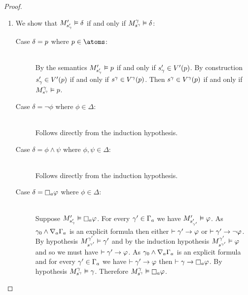 \begin{proof}
\begin{enumerate}
    \item
        We show that $\kPModelP{\kStateSP_\gamma} \entails \delta$ if and only if $\kPModel[\gamma]{\kStateS[\gamma]} \entails \delta$:
        \begin{description}
            \item[Case $\delta = \atomP$ where $\atomP \in \atoms$:]
                \hfill\\
                By the semantics $\kPModelP{\kStateSP_\gamma} \entails \atomP$ if and only if $\kStateSP_\gamma \in \kValuationP(\atomP)$.
                By construction $\kStateSP_\gamma \in \kValuationP(\atomP)$ if and only if $\kStateS[\gamma] \in \kValuation[\gamma](\atomP)$.
                Then $\kStateS[\gamma] \in \kValuation[\gamma](\atomP)$ if and only if $\kPModel[\gamma]{\kStateS[\gamma]} \entails \atomP$.
            \item[Case $\delta = \lnot \phi$ where $\phi \in \Delta$:]
                \hfill\\
                Follows directly from the induction hypothesis.
            \item[Case $\delta = \phi \land \psi$ where $\phi, \psi \in \Delta$:]
                \hfill\\
                Follows directly from the induction hypothesis.
            \item[Case $\delta = \necessaryA \phi$ where $\phi \in \Delta$:]
                \hfill\\
                Suppose $\kPModelP{\kStateSP_\gamma} \entails \necessaryA \phi$.
                For every $\gamma' \in \Gamma_\agentA$ we have $\kPModelP{\kStateSP_{\gamma'}} \entails \phi$.
                As $\gamma_0 \land \coversA \Gamma_\agentA$ is an explicit formula then either $\proves \gamma' \implies \phi$ or $\proves \gamma' \implies \lnot \phi$.
                By hypothesis $\kPModel[\gamma']{\kStateS[\gamma']} \entails \gamma'$ and by the induction hypothesis $\kPModel[\gamma']{\kStateS[\gamma']} \entails \phi$ and so we must have $\proves \gamma' \implies \phi$.
                As $\gamma_0 \land \coversA \Gamma_\agentA$ is an explicit formula and for every $\gamma' \in \Gamma_\agentA$ we have $\proves \gamma' \implies \phi$ then $\proves \gamma \implies \necessaryA \phi$.
                By hypothesis $\kPModel[\gamma]{\kStateS[\gamma]} \entails \gamma$.
                Therefore $\kPModel[\gamma]{\kStateS[\gamma]} \entails \necessaryA \phi$.


\end{description}
\end{enumerate}
\end{proof}
